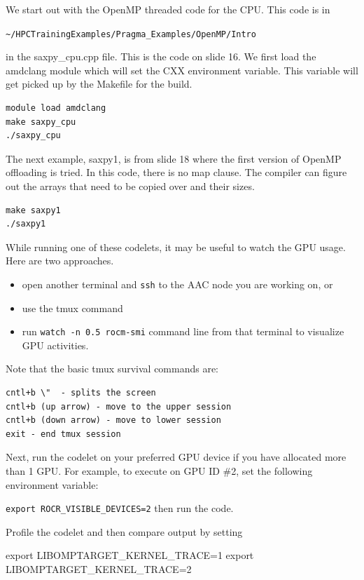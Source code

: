 \documentclass[
]{article}
\let\oldtexttt\texttt
\renewcommand{\texttt}[1]{
  \colorbox{Light}{\oldtexttt{#1}}
}
\newenvironment{Shaded}{}{}
\newcommand{\BuiltInTok}[1]{#1}
\newcommand{\NormalTok}[1]{#1}
\newcommand{\VariableTok}[1]{\textcolor[rgb]{0.10,0.09,0.49}{#1}}
\begin{document}
We start out with the OpenMP threaded code for the CPU. This code is in

\texttt{\textasciitilde{}/HPCTrainingExamples/Pragma\_Examples/OpenMP/Intro}

in the saxpy\_cpu.cpp file. This is the code on slide 16. We first load
the amdclang module which will set the CXX environment variable. This
variable will get picked up by the Makefile for the build.

\begin{verbatim}
module load amdclang
make saxpy_cpu
./saxpy_cpu
\end{verbatim}

The next example, saxpy1, is from slide 18 where the first version of
OpenMP offloading is tried. In this code, there is no map clause. The
compiler can figure out the arrays that need to be copied over and their
sizes.

\begin{verbatim}
make saxpy1
./saxpy1
\end{verbatim}

While running one of these codelets, it may be useful to watch the GPU
usage. Here are two approaches.

\begin{itemize}
\item
  open another terminal and \texttt{ssh} to the AAC node you are working
  on, or
\item
  use the tmux command
\item
  run \texttt{watch\ -n\ 0.5\ rocm-smi} command line from that terminal
  to visualize GPU activities.
\end{itemize}

Note that the basic tmux survival commands are:

\begin{verbatim}
cntl+b \"  - splits the screen  
cntl+b (up arrow) - move to the upper session
cntl+b (down arrow) - move to lower session
exit - end tmux session
\end{verbatim}

Next, run the codelet on your preferred GPU device if you have allocated
more than 1 GPU. For example, to execute on GPU ID \#2, set the
following environment variable:
\texttt{export\ ROCR\_VISIBLE\_DEVICES=2} then run the code.

Profile the codelet and then compare output by setting

\begin{Shaded}
\begin{Highlighting}[]
\BuiltInTok{export} \VariableTok{LIBOMPTARGET\_KERNEL\_TRACE=}\NormalTok{1}
\BuiltInTok{export} \VariableTok{LIBOMPTARGET\_KERNEL\_TRACE=}\NormalTok{2}
\end{Highlighting}
\end{Shaded}
\end{document}
